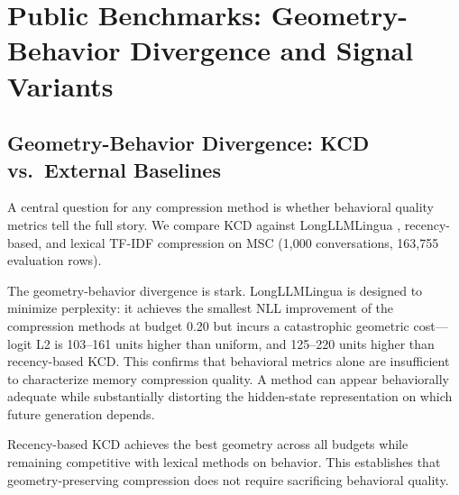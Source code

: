 \documentclass[11pt]{article}
\newcommand{\pname}[1]{\texttt{\small #1}}
\begin{document}
\section{Public Benchmarks: Geometry-Behavior Divergence and Signal Variants}

\subsection{Geometry-Behavior Divergence: KCD vs.\ External Baselines}
A central question for any compression method is whether behavioral quality metrics tell the full story. We compare KCD against LongLLMLingua \cite{longllmlingua}, recency-based, and lexical TF-IDF compression on MSC (1{,}000 conversations, 163{,}755 evaluation rows).

\begin{table}[t]
\centering
\caption{External baseline comparison on MSC (\pname{qwen25\_15b}, 1{,}000 conversations). Logit L2 and answer NLL are conversation-level means. Lower is better for both.}
\label{tab:msc_baselines}
\end{table}

The geometry-behavior divergence is stark. LongLLMLingua is designed to minimize perplexity: it achieves the smallest NLL improvement of the compression methods at budget 0.20 but incurs a catastrophic geometric cost---logit L2 is 103--161 units higher than uniform, and 125--220 units higher than recency-based KCD. This confirms that behavioral metrics alone are insufficient to characterize memory compression quality. A method can appear behaviorally adequate while substantially distorting the hidden-state representation on which future generation depends.

Recency-based KCD achieves the best geometry across all budgets while remaining competitive with lexical methods on behavior. This establishes that geometry-preserving compression does not require sacrificing behavioral quality.
\end{document}
